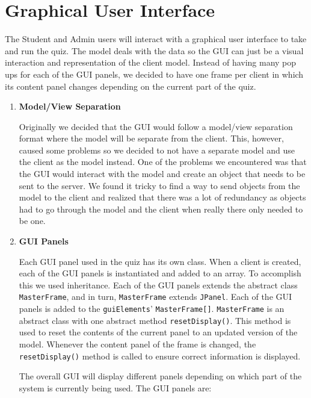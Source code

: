 \section{Graphical User Interface}
\label{sec:graphical_user_interface}

The Student and Admin users will interact with a graphical user interface to
take and run the quiz. The model deals with the data so the GUI can just be a
visual interaction and representation of the client model. Instead of having
many pop ups for each of the GUI panels, we decided to have one frame per
client in which its content panel changes depending on the current part of the
quiz.

\begin{enumerate}

	\item \textbf{Model/View Separation}

		Originally we decided that the GUI would follow a model/view separation
		format where the model will be separate from the client. This, however,
		caused some problems so we decided to not have a separate model and use
		the client as the model instead. One of the problems we encountered was
		that the GUI would interact with the model and create an object that
		needs to be sent to the server. We found it tricky to find a way to
		send objects from the model to the client and realized that there was a
		lot of redundancy as objects had to go through the model and the client
		when really there only needed to be one.

	\item \textbf{GUI Panels}

		Each GUI panel used in the quiz has its own class.  When a client is
		created, each of the GUI panels is instantiated and added to an array.
		To accomplish this we used inheritance. Each of the GUI panels extends
		the abstract class \texttt{MasterFrame}, and in turn,
		\texttt{MasterFrame} extends \texttt{JPanel}.  Each of the GUI panels
		is added to the \texttt{guiElements}' \texttt{MasterFrame[]}.
		\texttt{MasterFrame} is an abstract class with one abstract method
		\verb+resetDisplay()+.  This method is used to reset the contents of
		the current panel to an updated version of the model.  Whenever the
		content panel of the frame is changed, the \verb+resetDisplay()+ method
		is called to ensure correct information is displayed.

		The overall GUI will display different panels depending on which part of
		the system is currently being used. The GUI panels are:


\end{enumerate}
